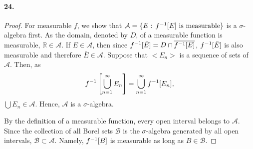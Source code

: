   \paragraph{24.}
  \begin{proof}
    For measurable $f$, we show that $\mathcal{A}=\{E:\, f^{-1}[E]\text{ is 
    measurable}\}$ is a $\sigma$-algebra first. As the domain, denoted by $D$, 
    of a measurable function is measurable, $\mathbb{R}\in\mathcal{A}$. If
    $E\in\mathcal{A}$, then since $f^{-1}[\bar{E}]= D\cap \overline{f^{-1}[E]}$,
    $f^{-1}[\bar{E}]$ is also measurable and therefore $\bar{E}\in\mathcal{A}$.
    Suppose that $<E_n>$ is a sequence of sets of $\mathcal{A}$. Then, as
    \[
      f^{-1}\left[\bigcup_{n=1}^\infty E_n\right] = 
      \bigcup_{n=1}^\infty f^{-1}[E_n],
    \]
    $\bigcup E_n\in\mathcal{A}$. Hence, $\mathcal{A}$ is a $\sigma$-algebra.\par
    By the definition of a measurable function, every open interval belongs to 
    $\mathcal{A}$. Since the collection of all Borel sets $\mathcal{B}$ is the
    $\sigma$-algebra generated by all open intervals, $\mathcal{B}\subset
    \mathcal{A}$. Namely, $f^{-1}[B]$ is measurable as long as $B\in\mathcal{B}$.
  \end{proof}


